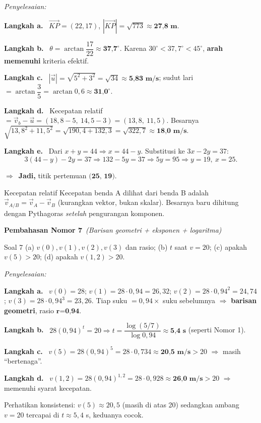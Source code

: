 \documentclass[11pt,a4paper]{article}
\newcommand{\jawab}{\par\smallskip\noindent\textit{\textcolor{oranye}{Penyelesaian:}}\par\smallskip}
\newcommand{\langkah}[1]{\par\smallskip\noindent\textbf{\textcolor{biru}{Langkah #1.}}\ }
\newcommand{\jadi}{\par\smallskip\noindent$\Rightarrow$\ \textbf{Jadi, }}
\newcommand{\nomorjudul}[2]{\par\bigskip\noindent%
  {\large\bfseries\color{ungu}Pembahasan Nomor #1}\ {\normalfont\itshape\color{gray}(#2)}\par\nopagebreak\smallskip}
\begin{document}
\jawab
\langkah{a} $\vec{KP}=(22,17)$, $|\vec{KP}|=\sqrt{773}\approx\textbf{27{,}8 m}$.

\langkah{b} $\theta=\arctan\dfrac{17}{22}\approx\textbf{37{,}7}^\circ$. Karena
$30^\circ<37{,}7^\circ<45^\circ$, \textbf{arah memenuhi} kriteria efektif.

\langkah{c} $|\vec{u}|=\sqrt{5^2+3^2}=\sqrt{34}\approx\textbf{5{,}83 m/s}$; sudut lari
$=\arctan\dfrac{3}{5}=\arctan0{,}6\approx\textbf{31{,}0}^\circ$.

\langkah{d} Kecepatan relatif $=\vec{v}_b-\vec{u}=(18{,}8-5,\ 14{,}5-3)=(13{,}8,\ 11{,}5)$.
Besarnya $\sqrt{13{,}8^2+11{,}5^2}=\sqrt{190{,}4+132{,}3}=\sqrt{322{,}7}\approx\textbf{18{,}0 m/s}$.

\langkah{e} Dari $x+y=44 \Rightarrow x=44-y$. Substitusi ke $3x-2y=37$:
\[
3(44-y)-2y=37 \Rightarrow 132-5y=37 \Rightarrow 5y=95 \Rightarrow y=19,\ x=25.
\]
\jadi titik pertemuan $\textbf{(25, 19)}$.

\begin{ingat}{Kecepatan relatif}
Kecepatan benda A dilihat dari benda B adalah $\vec{v}_{A/B}=\vec{v}_A-\vec{v}_B$
(kurangkan vektor, bukan skalar). Besarnya baru dihitung dengan Pythagoras
\emph{setelah} pengurangan komponen.
\end{ingat}

\nomorjudul{7}{Barisan geometri + eksponen + logaritma}
\begin{soalbox}{Soal 7}
(a) $v(0),v(1),v(2),v(3)$ dan rasio; (b) $t$ saat $v=20$; (c) apakah $v(5)>20$;
(d) apakah $v(1{,}2)>20$.
\end{soalbox}

\jawab
\langkah{a} $v(0)=28$; $v(1)=28\cdot0{,}94=26{,}32$; $v(2)=28\cdot0{,}94^2=24{,}74$;
$v(3)=28\cdot0{,}94^3=23{,}26$. Tiap suku $=0{,}94\times$ suku sebelumnya
$\Rightarrow$ \textbf{barisan geometri}, rasio $\textbf{r=0{,}94}$.

\langkah{b} $28(0{,}94)^t=20 \Rightarrow t=\dfrac{\log(5/7)}{\log0{,}94}\approx\textbf{5{,}4 s}$
(seperti Nomor 1).

\langkah{c} $v(5)=28(0{,}94)^5=28\cdot0{,}734\approx\textbf{20{,}5 m/s}>20$
$\Rightarrow$ masih ``bertenaga''.

\langkah{d} $v(1{,}2)=28(0{,}94)^{1{,}2}=28\cdot0{,}928\approx\textbf{26{,}0 m/s}>20$
$\Rightarrow$ memenuhi syarat kecepatan.

\begin{tips}
Perhatikan konsistensi: $v(5)\approx20{,}5$ (masih di atas 20) sedangkan ambang
$v=20$ tercapai di $t\approx5{,}4$ s, keduanya cocok.
\end{tips}
\end{document}
